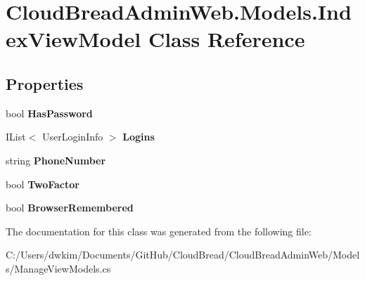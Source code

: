 \hypertarget{class_cloud_bread_admin_web_1_1_models_1_1_index_view_model}{}\section{Cloud\+Bread\+Admin\+Web.\+Models.\+Index\+View\+Model Class Reference}
\label{class_cloud_bread_admin_web_1_1_models_1_1_index_view_model}
\subsection*{Properties}
\begin{DoxyCompactItemize}
\item 
bool {\bfseries Has\+Password}\hypertarget{class_cloud_bread_admin_web_1_1_models_1_1_index_view_model_a341f3ba7ac181d4a1e839e4053b4a06b}{}\label{class_cloud_bread_admin_web_1_1_models_1_1_index_view_model_a341f3ba7ac181d4a1e839e4053b4a06b}

\item 
I\+List$<$ User\+Login\+Info $>$ {\bfseries Logins}\hypertarget{class_cloud_bread_admin_web_1_1_models_1_1_index_view_model_ae62fc9836800b53b5f9c4e2b858e6257}{}\label{class_cloud_bread_admin_web_1_1_models_1_1_index_view_model_ae62fc9836800b53b5f9c4e2b858e6257}

\item 
string {\bfseries Phone\+Number}\hypertarget{class_cloud_bread_admin_web_1_1_models_1_1_index_view_model_a8f42d419be92c45f1a7952220f34bbe9}{}\label{class_cloud_bread_admin_web_1_1_models_1_1_index_view_model_a8f42d419be92c45f1a7952220f34bbe9}

\item 
bool {\bfseries Two\+Factor}\hypertarget{class_cloud_bread_admin_web_1_1_models_1_1_index_view_model_a5f903d979816303fcafdeff2f530efc8}{}\label{class_cloud_bread_admin_web_1_1_models_1_1_index_view_model_a5f903d979816303fcafdeff2f530efc8}

\item 
bool {\bfseries Browser\+Remembered}\hypertarget{class_cloud_bread_admin_web_1_1_models_1_1_index_view_model_af678dc400ffcf0b9da0500f6bbecd917}{}\label{class_cloud_bread_admin_web_1_1_models_1_1_index_view_model_af678dc400ffcf0b9da0500f6bbecd917}

\end{DoxyCompactItemize}


The documentation for this class was generated from the following file\+:\begin{DoxyCompactItemize}
\item 
C\+:/\+Users/dwkim/\+Documents/\+Git\+Hub/\+Cloud\+Bread/\+Cloud\+Bread\+Admin\+Web/\+Models/Manage\+View\+Models.\+cs\end{DoxyCompactItemize}
